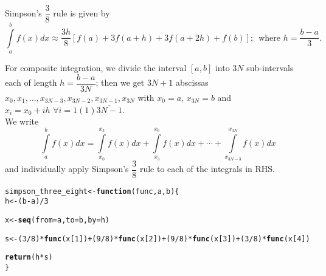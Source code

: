 \documentclass[11pt, a4paper]{article}\usepackage[]{graphicx}\usepackage[]{xcolor}
\makeatletter
\newcommand{\hlnum}[1]{\textcolor[rgb]{0.686,0.059,0.569}{#1}}%
\newcommand{\hlopt}[1]{\textcolor[rgb]{0,0,0}{#1}}%
\newcommand{\hldef}[1]{\textcolor[rgb]{0.345,0.345,0.345}{#1}}%
\newcommand{\hlkwa}[1]{\textcolor[rgb]{0.161,0.373,0.58}{\textbf{#1}}}%
\newcommand{\hlkwb}[1]{\textcolor[rgb]{0.69,0.353,0.396}{#1}}%
\newcommand{\hlkwc}[1]{\textcolor[rgb]{0.333,0.667,0.333}{#1}}%
\newcommand{\hlkwd}[1]{\textcolor[rgb]{0.737,0.353,0.396}{\textbf{#1}}}%
\newenvironment{kframe}{%
 \def\at@end@of@kframe{}%
 \ifinner\ifhmode%
  \def\at@end@of@kframe{\end{minipage}}%
  \begin{minipage}{\columnwidth}%
 \fi\fi%
 \def\FrameCommand##1{\hskip\@totalleftmargin \hskip-\fboxsep
 \colorbox{shadecolor}{##1}\hskip-\fboxsep
     \hskip-\linewidth \hskip-\@totalleftmargin \hskip\columnwidth}%
 \MakeFramed {\advance\hsize-\width
   \@totalleftmargin\z@ \linewidth\hsize
   \@setminipage}}%
 {\par\unskip\endMakeFramed%
 \at@end@of@kframe}
\newenvironment{knitrout}{}{} %
\makeatother
\begin{document}
\faArrowAltCircleRight[regular] \hspace{0.2cm} Simpson's $\dfrac{3}{8}$ rule is given by $$\int \limits_{a}^{b} f(x) dx \approx \dfrac{3h}{8} \left[ f(a) + 3 f(a+h) + 3 f(a+2h) + f(b) \right]; \,\,\, \text{where } h = \dfrac{b-a}{3}.$$

For composite integration, we divide the interval $[a, b]$ into $3N$ sub-intervals each of length $h = \dfrac{b-a}{3N}$; then we get $3N + 1$ abscissas $x_0, x_1, \ldots, x_{3N-3}, x_{3N-2}, x_{3N-1}, x_{3N}$ with $x_0 = a$, $x_{3N} = b$ and $x_i = x_0 + ih \,\, \forall i = 1(1)\overline{3N-1}$. \\

We write $$\int \limits_{a}^{b} f(x) dx = \int \limits_{x_0}^{x_3} f(x) dx + \int \limits_{x_3}^{x_6} f(x) dx + \cdots + \int \limits_{x_{3N-3}}^{x_{3N}} f(x) dx$$ and individually apply Simpson's $\dfrac{3}{8}$ rule to each of the integrals in RHS.

\begin{knitrout}
\color{fgcolor}\begin{kframe}
\begin{alltt}
\hldef{simpson_three_eight} \hlkwb{<-} \hlkwa{function}\hldef{(}\hlkwc{func}\hldef{,} \hlkwc{a}\hldef{,} \hlkwc{b}\hldef{)\{}
  \hldef{h} \hlkwb{<-} \hldef{(b} \hlopt{-} \hldef{a)} \hlopt{/} \hlnum{3}

  \hldef{x} \hlkwb{<-} \hlkwd{seq}\hldef{(}\hlkwc{from} \hldef{= a,} \hlkwc{to} \hldef{= b,} \hlkwc{by} \hldef{= h)}

  \hldef{s} \hlkwb{<-} \hldef{(}\hlnum{3}\hlopt{/}\hlnum{8}\hldef{)} \hlopt{*} \hlkwd{func}\hldef{(x[}\hlnum{1}\hldef{])} \hlopt{+} \hldef{(}\hlnum{9}\hlopt{/}\hlnum{8}\hldef{)} \hlopt{*} \hlkwd{func}\hldef{(x[}\hlnum{2}\hldef{])} \hlopt{+} \hldef{(}\hlnum{9}\hlopt{/}\hlnum{8}\hldef{)} \hlopt{*} \hlkwd{func}\hldef{(x[}\hlnum{3}\hldef{])} \hlopt{+} \hldef{(}\hlnum{3}\hlopt{/}\hlnum{8}\hldef{)} \hlopt{*} \hlkwd{func}\hldef{(x[}\hlnum{4}\hldef{])}

  \hlkwd{return}\hldef{(h} \hlopt{*} \hldef{s)}
\hldef{\}}
\end{alltt}
\end{kframe}
\end{knitrout}
\end{document}
